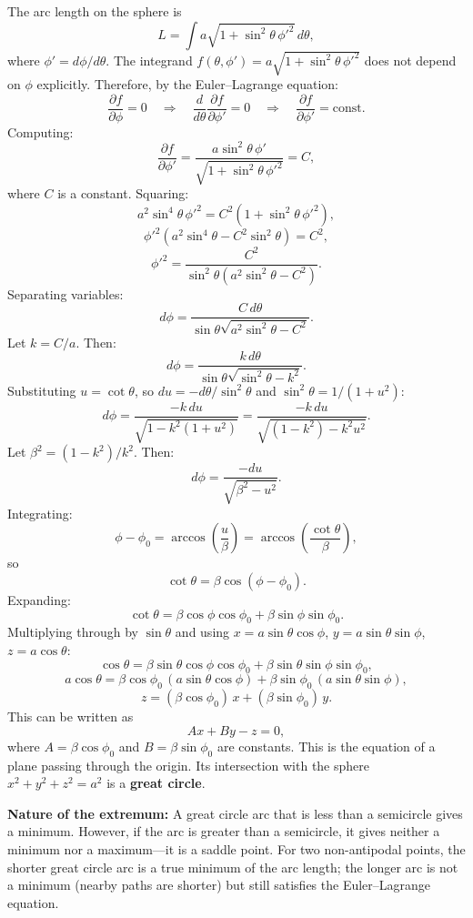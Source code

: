 \documentclass[12pt]{article}
\begin{document}
The arc length on the sphere is
\[
  L = \int a\sqrt{1 + \sin^2\theta\,\phi'^2}\,d\theta,
\]
where $\phi' = d\phi/d\theta$. The integrand $f(\theta, \phi') = a\sqrt{1 + \sin^2\theta\,\phi'^2}$ does not depend on $\phi$ explicitly. Therefore, by the Euler--Lagrange equation:
\[
  \frac{\partial f}{\partial \phi} = 0
  \quad \Longrightarrow \quad
  \frac{d}{d\theta}\frac{\partial f}{\partial \phi'} = 0
  \quad \Longrightarrow \quad
  \frac{\partial f}{\partial \phi'} = \text{const}.
\]
Computing:
\[
  \frac{\partial f}{\partial \phi'} = \frac{a\sin^2\theta\,\phi'}{\sqrt{1 + \sin^2\theta\,\phi'^2}} = C,
\]
where $C$ is a constant. Squaring:
\[
  a^2\sin^4\theta\,\phi'^2 = C^2(1 + \sin^2\theta\,\phi'^2),
\]
\[
  \phi'^2(a^2\sin^4\theta - C^2\sin^2\theta) = C^2,
\]
\[
  \phi'^2 = \frac{C^2}{\sin^2\theta(a^2\sin^2\theta - C^2)}.
\]
Separating variables:
\[
  d\phi = \frac{C\,d\theta}{\sin\theta\sqrt{a^2\sin^2\theta - C^2}}.
\]
Let $k = C/a$. Then:
\[
  d\phi = \frac{k\,d\theta}{\sin\theta\sqrt{\sin^2\theta - k^2}}.
\]
Substituting $u = \cot\theta$, so $du = -d\theta/\sin^2\theta$ and $\sin^2\theta = 1/(1+u^2)$:
\[
  d\phi = \frac{-k\,du}{\sqrt{1 - k^2(1+u^2)}}
  = \frac{-k\,du}{\sqrt{(1-k^2) - k^2 u^2}}.
\]
Let $\beta^2 = (1-k^2)/k^2$. Then:
\[
  d\phi = \frac{-du}{\sqrt{\beta^2 - u^2}}.
\]
Integrating:
\[
  \phi - \phi_0 = \arccos\!\left(\frac{u}{\beta}\right)
  = \arccos\!\left(\frac{\cot\theta}{\beta}\right),
\]
so
\[
  \cot\theta = \beta\cos(\phi - \phi_0).
\]
Expanding:
\[
  \cot\theta = \beta\cos\phi\cos\phi_0 + \beta\sin\phi\sin\phi_0.
\]
Multiplying through by $\sin\theta$ and using $x = a\sin\theta\cos\phi$, $y = a\sin\theta\sin\phi$, $z = a\cos\theta$:
\[
  \cos\theta = \beta\sin\theta\cos\phi\cos\phi_0 + \beta\sin\theta\sin\phi\sin\phi_0,
\]
\[
  a\cos\theta = \beta\cos\phi_0\,(a\sin\theta\cos\phi) + \beta\sin\phi_0\,(a\sin\theta\sin\phi),
\]
\[
  z = (\beta\cos\phi_0)\,x + (\beta\sin\phi_0)\,y.
\]
This can be written as
\[
  Ax + By - z = 0,
\]
where $A = \beta\cos\phi_0$ and $B = \beta\sin\phi_0$ are constants. This is the equation of a plane passing through the origin. Its intersection with the sphere $x^2 + y^2 + z^2 = a^2$ is a \textbf{great circle}.

\medskip
\noindent\textbf{Nature of the extremum:} A great circle arc that is less than a semicircle gives a minimum. However, if the arc is greater than a semicircle, it gives neither a minimum nor a maximum---it is a saddle point. For two non-antipodal points, the shorter great circle arc is a true minimum of the arc length; the longer arc is not a minimum (nearby paths are shorter) but still satisfies the Euler--Lagrange equation.
\end{document}
